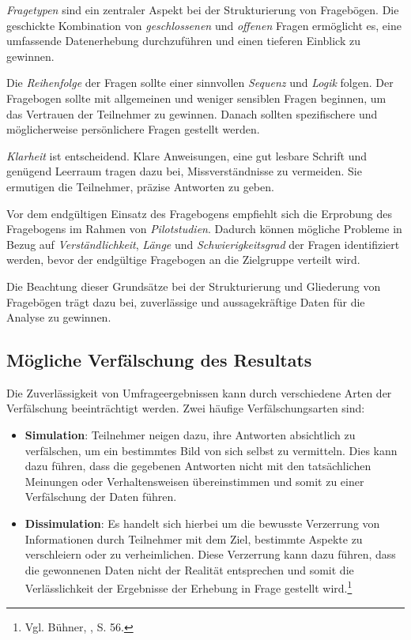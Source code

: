 \textit{Fragetypen} sind ein zentraler Aspekt bei der Strukturierung von Fragebögen. Die geschickte Kombination von
\textit{geschlossenen} und \textit{offenen} Fragen ermöglicht es, eine umfassende Datenerhebung durchzuführen und einen
tieferen Einblick zu gewinnen.

Die \textit{Reihenfolge} der Fragen sollte einer sinnvollen \textit{Sequenz} und \textit{Logik} folgen. Der Fragebogen
sollte mit allgemeinen und weniger sensiblen Fragen beginnen, um das Vertrauen der Teilnehmer zu gewinnen. Danach sollten
spezifischere und möglicherweise persönlichere Fragen gestellt werden.

\textit{Klarheit} ist entscheidend. Klare Anweisungen, eine gut lesbare Schrift und genügend Leerraum tragen dazu bei,
Missverständnisse zu vermeiden. Sie ermutigen die Teilnehmer, präzise Antworten zu geben.

Vor dem endgültigen Einsatz des Fragebogens empfiehlt sich die Erprobung des Fragebogens im Rahmen von \textit{Pilotstudien}.
Dadurch können mögliche Probleme in Bezug auf \textit{Verständlichkeit}, \textit{Länge} und \textit{Schwierigkeitsgrad}
der Fragen identifiziert werden, bevor der endgültige Fragebogen an die Zielgruppe verteilt wird.

Die Beachtung dieser Grundsätze bei der Strukturierung und Gliederung von Fragebögen trägt dazu bei, zuverlässige und
aussagekräftige Daten für die Analyse zu gewinnen.

\subsection{Mögliche Verfälschung des Resultats}
Die Zuverlässigkeit von Umfrageergebnissen kann durch verschiedene Arten der Verfälschung beeinträchtigt werden. Zwei
häufige Verfälschungsarten sind:
\begin{itemize}
    \item \textbf{Simulation}: Teilnehmer neigen dazu, ihre Antworten absichtlich zu verfälschen, um ein bestimmtes Bild
    von sich selbst zu vermitteln. Dies kann dazu führen, dass die gegebenen Antworten nicht mit den tatsächlichen
    Meinungen oder Verhaltensweisen übereinstimmen und somit zu einer Verfälschung der Daten führen.

    \item \textbf{Dissimulation}: Es handelt sich hierbei um die bewusste Verzerrung von Informationen durch Teilnehmer
    mit dem Ziel, bestimmte Aspekte zu verschleiern oder zu verheimlichen. Diese Verzerrung kann dazu führen, dass die
    gewonnenen Daten nicht der Realität entsprechen und somit die Verlässlichkeit der Ergebnisse der Erhebung in Frage
    gestellt wird.\footnote{Vgl. Bühner, \cite{Einfuehrung in die TEst und Fragebogenkonstruktion}, S. 56.}\\
\end{itemize}

